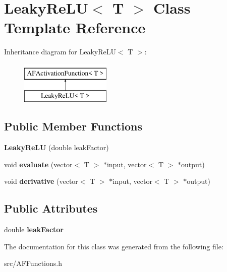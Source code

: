 \hypertarget{classLeakyReLU}{}\section{Leaky\+Re\+LU$<$ T $>$ Class Template Reference}
\label{classLeakyReLU}
Inheritance diagram for Leaky\+Re\+LU$<$ T $>$\+:\begin{figure}[H]
\begin{center}
\leavevmode
\includegraphics[height=2.000000cm]{classLeakyReLU}
\end{center}
\end{figure}
\subsection*{Public Member Functions}
\begin{DoxyCompactItemize}
\item 
\mbox{\label{classLeakyReLU_ab4a3dab7ddb62df216333ab61dbdb0b9}} 
{\bfseries Leaky\+Re\+LU} (double leak\+Factor)
\item 
\mbox{\label{classLeakyReLU_a9020ddae6a11791f60b253f6244016d3}} 
void {\bfseries evaluate} (vector$<$ T $>$ $\ast$input, vector$<$ T $>$ $\ast$output)
\item 
\mbox{\label{classLeakyReLU_ac85a6fb88ea4e3ea9d14bef0aa186298}} 
void {\bfseries derivative} (vector$<$ T $>$ $\ast$input, vector$<$ T $>$ $\ast$output)
\end{DoxyCompactItemize}
\subsection*{Public Attributes}
\begin{DoxyCompactItemize}
\item 
\mbox{\label{classLeakyReLU_a7f9f45f3f44d69f4e7390e4b3b8d50a4}} 
double {\bfseries leak\+Factor}
\end{DoxyCompactItemize}


The documentation for this class was generated from the following file\+:\begin{DoxyCompactItemize}
\item 
src/A\+F\+Functions.\+h\end{DoxyCompactItemize}

